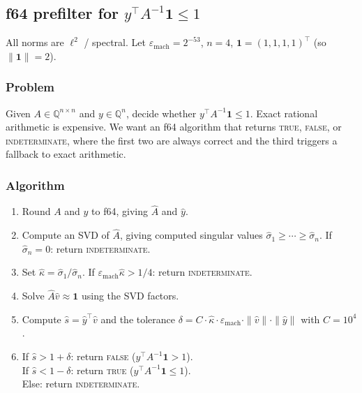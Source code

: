 %
%
%

\providecommand{\one}{\mathbf{1}}
\providecommand{\emach}{\varepsilon_{\mathrm{mach}}}

\subsection{f64 prefilter for $y^\top A^{-1}\one \le 1$}

All norms are $\ell^2$ / spectral.
Let $\emach = 2^{-53}$, $n = 4$, $\one = (1,1,1,1)^\top$
(so $\|\one\| = 2$).

\subsubsection*{Problem}

Given $A \in \mathbb{Q}^{n \times n}$ and $y \in \mathbb{Q}^n$,
decide whether $y^\top A^{-1}\one \le 1$.
Exact rational arithmetic is expensive.
We want an f64 algorithm that returns
\textsc{true}, \textsc{false}, or \textsc{indeterminate},
where the first two are always correct and the third
triggers a fallback to exact arithmetic.

\subsubsection*{Algorithm}

\begin{enumerate}
\item Round $A$ and $y$ to f64, giving $\hat{A}$ and $\hat{y}$.
\item Compute an SVD of $\hat{A}$, giving computed singular values
  $\hat\sigma_1 \ge \cdots \ge \hat\sigma_n$.
  If $\hat\sigma_n = 0$: return \textsc{indeterminate}.
\item Set $\hat\kappa = \hat\sigma_1 / \hat\sigma_n$.
  If $\emach \hat\kappa > 1/4$: return \textsc{indeterminate}.
\item Solve $\hat{A}\hat{v} \approx \one$ using the SVD factors.
\item Compute $\hat{s} = \hat{y}^\top\hat{v}$ and the tolerance
  $\delta = C \cdot \hat\kappa \cdot \emach
  \cdot \|\hat{v}\| \cdot \|\hat{y}\|$
  with $C = 10^4$.
\item If $\hat{s} > 1 + \delta$: return \textsc{false}
  ($y^\top A^{-1}\one > 1$).\\
  If $\hat{s} < 1 - \delta$: return \textsc{true}
  ($y^\top A^{-1}\one \le 1$).\\
  Else: return \textsc{indeterminate}.
\end{enumerate}


